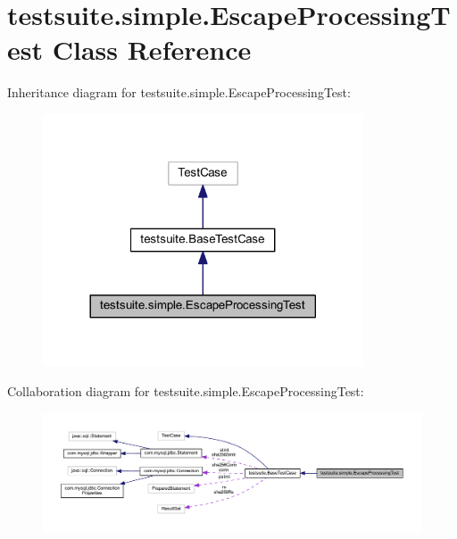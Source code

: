 \hypertarget{classtestsuite_1_1simple_1_1_escape_processing_test}{}\section{testsuite.\+simple.\+Escape\+Processing\+Test Class Reference}
\label{classtestsuite_1_1simple_1_1_escape_processing_test}


Inheritance diagram for testsuite.\+simple.\+Escape\+Processing\+Test\+:
\nopagebreak
\begin{figure}[H]
\begin{center}
\leavevmode
\includegraphics[width=269pt]{classtestsuite_1_1simple_1_1_escape_processing_test__inherit__graph}
\end{center}
\end{figure}


Collaboration diagram for testsuite.\+simple.\+Escape\+Processing\+Test\+:
\nopagebreak
\begin{figure}[H]
\begin{center}
\leavevmode
\includegraphics[width=350pt]{classtestsuite_1_1simple_1_1_escape_processing_test__coll__graph}
\end{center}
\end{figure}
